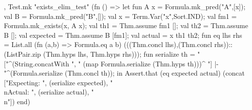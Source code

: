 \nwenddocs{}\plusendmoddef\nwstartdeflinemarkup{}\nwenddeflinemarkup
, Test.mk "exists_elim_test" (fn () =>
    let
      fun A x = Formula.mk_pred("A",[x]);
      val B = Formula.mk_pred("B",[]);
      val x = Term.Var("x",Sort.IND);
      val fm1 = Formula.mk_exists(x, A x);
      val th1 = Thm.assume fm1 [];
      val th2 = Thm.assume B [];
      val expected = Thm.assume B [fm1];
      val actual =  x th1 th2;
      fun eq lhs rhs =
        List.all (fn (a,b) => Formula.eq a b)
                 (((Thm.concl lhs),(Thm.concl
                                      rhs))::(ListPair.zip
                                                (Thm.hyps lhs,
                                                 Thm.hyps rhs)));
      fun serialize th = "["^(String.concatWith ", "
                                                (map Formula.serialize
                                                     (Thm.hyps th)))^
                         "] |- "^(Formula.serialize (Thm.concl th));
    in
      Assert.that (eq expected actual)
                  (concat ["Expecting: ",
                           (serialize expected),
                           "\\nActual: ",
                           (serialize actual),
                           "\\n"])
    end)

